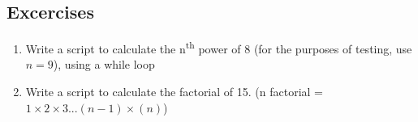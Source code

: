 \subsection{Excercises}

\begin{enumerate}
\item Write a script to calculate the n\textsuperscript{th} power of 8 (for the purposes of testing, use $n=9$), using a while loop
\item Write a script to calculate the factorial of 15. (n factorial = $1\times 2\times 3...(n-1)\times (n)$)
\end{enumerate}
